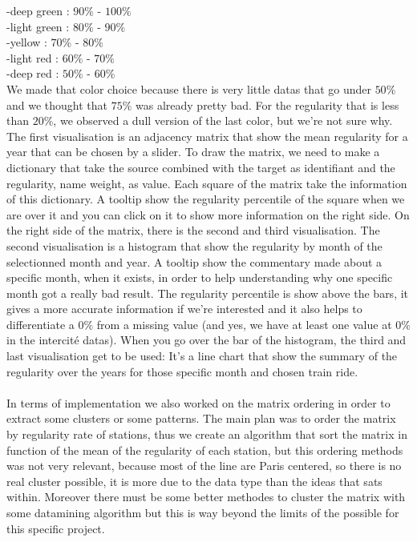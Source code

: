 \documentclass{vgtc}
\begin{document}
\indent -deep green : $90\%$ - $100\%$ \\
\indent -light green : $80\%$ - $90\%$ \\
\indent -yellow : $70\%$ - $80\%$ \\
\indent -light red : $60\%$ - $70\%$ \\
\indent -deep red : $50\%$ - $60\%$ 
\\
We made that color choice because there is very little datas that go under $50\%$ and we thought that $75\%$ was already pretty bad. For the regularity that is less than $20\%$, we observed a dull version of the last color, but we’re not sure why.
The first visualisation is an adjacency matrix that show the mean regularity for a year that can be chosen by a slider. To draw the matrix, we need to make a dictionary that take the source combined with the target as identifiant and  the regularity, name weight, as value. Each square of the matrix take the information of this dictionary. A tooltip show the regularity percentile of the square when we are over it and you can click on it to show more information on the right side.
On the right side of the matrix, there is the second and third visualisation.
The second visualisation is a histogram that show the regularity by month of the selectionned month and year. A tooltip show the commentary made about a specific month, when it exists, in order to help understanding why one specific month got a really bad result. The regularity percentile is show above the bars, it gives a more accurate information if we’re interested and it also helps to differentiate a $0\%$ from a missing value (and yes, we have at least one value at $0\%$ in the intercité datas).
When you go over the bar of the histogram, the third and last visualisation get to be used: It’s a line chart that show the summary of the regularity over the years for those specific month and chosen train ride.
\\
\\
\indent
In terms of implementation we also worked on the matrix ordering in order to extract some clusters or some patterns. The main plan was to order the matrix by regularity rate of stations, thus we create an algorithm that sort the matrix in function of the mean of the regularity of each station, but this ordering methods was not very relevant, because most of the line are Paris centered, so there is no real cluster possible, it is more due to the data type than the ideas that sats within. Moreover there must be some better methodes to cluster the matrix with some datamining algorithm but this is way beyond the limits of the possible for this specific project.
\end{document}
